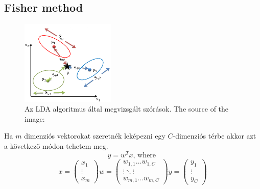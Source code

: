 \subsection{Fisher method}
\begin{figure}
	\centering		
	\includegraphics[width = 0.4\textwidth]{rsrc/LDA_basic.png}
	\caption{Az LDA algoritmus által megvizsgált szórások. The source of the image: \cite{LDA}}
	\label{fig:LDA abrazolas}
\end{figure}

Ha $ m $ dimenziós vektorokat szeretnék leképezni egy $ C $-dimenziós térbe akkor azt a következő módon tehetem meg.
\begin{equation}
y = w^Tx \textrm{, where } 
\end{equation}
\begin{equation}
x = \left(
\begin{array}{ccc}
x_1\\
\vdots\\
x_m
\end{array} \right)
w=\left(
\begin{array}{ccc}
w_{1,1} \dots w_{1,C}\\
\vdots \ddots \vdots\\
w_{m,1} \dots w_{m,C}
\end{array}
\right)
y = \left(
\begin{array}{ccc}
y_1\\
\vdots\\
y_C
\end{array}\right)
\label{equ:Alap_egyenlet}
\end{equation}